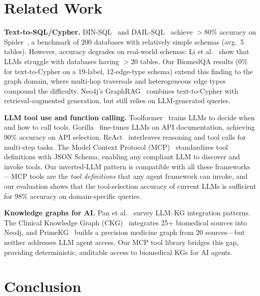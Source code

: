 \documentclass[sigconf]{acmart}
\begin{document}
\section{Related Work}\label{sec:related}

\textbf{Text-to-SQL/Cypher.}
DIN-SQL~\cite{pourreza2024dinsql} and DAIL-SQL~\cite{gao2024texttosql}
achieve $>$80\% accuracy on Spider~\cite{yu2018spider}, a benchmark
of 200 databases with relatively simple schemas (avg.\ 5 tables).
However, accuracy degrades on real-world schemas: Li
et al.~\cite{li2024dawn} show that LLMs struggle with
databases having $>$20 tables.  Our BiomedQA results (0\% for
text-to-Cypher on a 19-label, 12-edge-type schema) extend this
finding to the graph domain, where multi-hop traversals and
heterogeneous edge types compound the difficulty.
Neo4j's GraphRAG~\cite{neo4j_graphrag} combines text-to-Cypher
with retrieval-augmented generation, but still relies on
LLM-generated queries.

\smallskip\noindent\textbf{LLM tool use and function calling.}
Toolformer~\cite{schick2024toolformer} trains LLMs to decide when
and how to call tools.  Gorilla~\cite{patil2023gorilla} fine-tunes
LLMs on API documentation, achieving 90\% accuracy on API
selection.  ReAct~\cite{yao2023react} interleaves reasoning and
tool calls for multi-step tasks.  The Model Context Protocol
(MCP)~\cite{anthropic2024mcp} standardizes tool definitions
with JSON Schema, enabling any compliant LLM to discover and
invoke tools.  Our inverted-LLM pattern is compatible with all
these frameworks---MCP tools are the \emph{tool definitions}
that any agent framework can invoke, and our evaluation shows
that the tool-selection accuracy of current LLMs is sufficient
for 98\% accuracy on domain-specific queries.

\smallskip\noindent\textbf{Knowledge graphs for AI.}
Pan et al.~\cite{pan2024unifying} survey LLM--KG integration
patterns.  The Clinical Knowledge Graph
(CKG)~\cite{santos2022ckg} integrates 25+ biomedical sources
into Neo4j, and PrimeKG~\cite{chandak2023primekg} builds a
precision medicine graph from 20 sources---but neither addresses
LLM agent access.  Our MCP tool library bridges this gap,
providing deterministic, auditable access to biomedical KGs
for AI agents.

\section{Conclusion}
\end{document}
